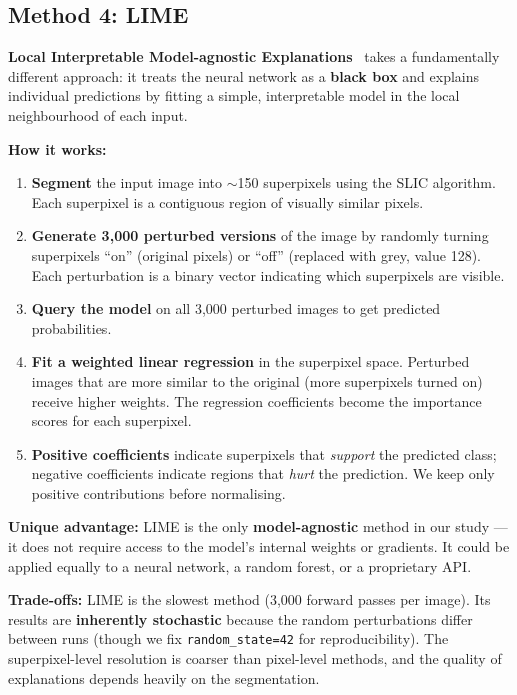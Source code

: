 \documentclass[12pt, a4paper]{article}
\begin{document}
\subsection{Method 4: LIME}

\textbf{Local Interpretable Model-agnostic Explanations}~\cite{ribeiro2016lime}
takes a fundamentally different approach: it treats the neural network as a
\textbf{black box} and explains individual predictions by fitting a simple,
interpretable model in the local neighbourhood of each input.

\textbf{How it works:}
\begin{enumerate}[leftmargin=*]
    \item \textbf{Segment} the input image into $\sim$150 superpixels using the
          SLIC algorithm.  Each superpixel is a contiguous region of visually
          similar pixels.
    \item \textbf{Generate 3{,}000 perturbed versions} of the image by randomly
          turning superpixels ``on'' (original pixels) or ``off'' (replaced
          with grey, value 128).  Each perturbation is a binary vector
          indicating which superpixels are visible.
    \item \textbf{Query the model} on all 3{,}000 perturbed images to get
          predicted probabilities.
    \item \textbf{Fit a weighted linear regression} in the superpixel space.
          Perturbed images that are more similar to the original (more
          superpixels turned on) receive higher weights.  The regression
          coefficients become the importance scores for each superpixel.
    \item \textbf{Positive coefficients} indicate superpixels that
          \emph{support} the predicted class; negative coefficients indicate
          regions that \emph{hurt} the prediction.  We keep only positive
          contributions before normalising.
\end{enumerate}

\textbf{Unique advantage:} LIME is the only \textbf{model-agnostic} method in
our study --- it does not require access to the model's internal weights or
gradients.  It could be applied equally to a neural network, a random forest,
or a proprietary API.

\textbf{Trade-offs:} LIME is the slowest method (3{,}000 forward passes per
image).  Its results are \textbf{inherently stochastic} because the random
perturbations differ between runs (though we fix \texttt{random\_state=42} for
reproducibility).  The superpixel-level resolution is coarser than pixel-level
methods, and the quality of explanations depends heavily on the segmentation.
\end{document}
